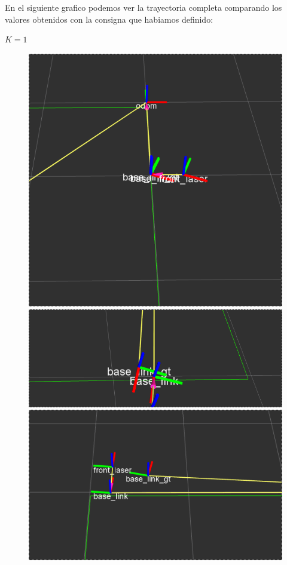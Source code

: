 En el siguiente grafico podemos ver la trayectoria completa comparando los valores obtenidos con la consigna que habiamos definido:


$K = 1$


\begin{figure}[!htb]
  \includegraphics[width=\linewidth]{imagenesExpLazoCerrado/k1/1.png}
\endminipage\hfill
{}
  \includegraphics[width=\linewidth]{imagenesExpLazoCerrado/k1/3.png}
\endminipage\hfill
{}%
  \includegraphics[width=\linewidth]{imagenesExpLazoCerrado/k1/5.png}
\endminipage
\end{figure}

